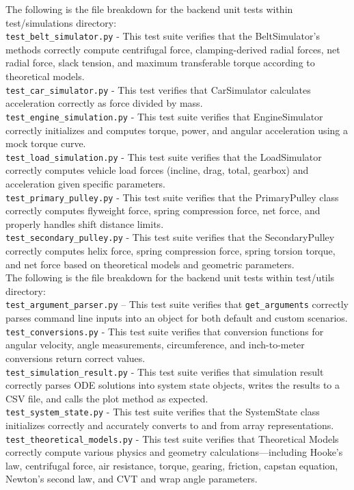 \documentclass[12pt, titlepage]{article}
\begin{document}
\noindent The following is the file breakdown for the backend unit tests within test/simulations directory:
\\
\texttt{test\_belt\_simulator.py} - This test suite verifies that the BeltSimulator’s methods correctly compute centrifugal force, clamping-derived radial forces, net radial force, slack tension, and maximum transferable torque according to theoretical models.
\\
\texttt{test\_car\_simulator.py} - This test verifies that CarSimulator calculates acceleration correctly as force divided by mass.
\\
\texttt{test\_engine\_simulation.py} - This test suite verifies that EngineSimulator correctly initializes and computes torque, power, and angular acceleration using a mock torque curve.
\\
\texttt{test\_load\_simulation.py} - This test suite verifies that the LoadSimulator correctly computes vehicle load forces (incline, drag, total, gearbox) and acceleration given specific parameters.
\\
\texttt{test\_primary\_pulley.py} - This test suite verifies that the PrimaryPulley class correctly computes flyweight force, spring compression force, net force, and properly handles shift distance limits.
\\
\texttt{test\_secondary\_pulley.py} - This test suite verifies that the SecondaryPulley correctly computes helix force, spring compression force, spring torsion torque, and net force based on theoretical models and geometric parameters. 
\\

\noindent The following is the file breakdown for the backend unit tests within test/utils directory:
\\
\texttt{test\_argument\_parser.py} -- This test suite verifies that \texttt{get\_arguments} correctly parses command line inputs into an object for both default and custom scenarios.
\\
\texttt{test\_conversions.py} - This test suite verifies that conversion functions for angular velocity, angle measurements, circumference, and inch-to-meter conversions return correct values.
\\
\texttt{test\_simulation\_result.py} - This test suite verifies that simulation result correctly parses ODE solutions into system state objects, writes the results to a CSV file, and calls the plot method as expected.
\\
\texttt{test\_system\_state.py} - This test suite verifies that the SystemState class initializes correctly and accurately converts to and from array representations.
\\
\texttt{test\_theoretical\_models.py} - This test suite verifies that Theoretical Models correctly compute various physics and geometry calculations—including Hooke's law, centrifugal force, air resistance, torque, gearing, friction, capstan equation, Newton's second law, and CVT and wrap angle parameters.
\end{document}
